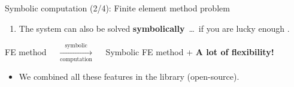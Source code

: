 \begin{frame}{Symbolic computation (2/4): Finite element method problem}
\begin{itemize}
\begin{enumerate}
      \item The system can also be solved \textbf{symbolically}~\dots~if you are lucky enough \raisebox{-3.5pt}{\huge\trollface{}}.
    \end{enumerate}
  \end{itemize}
  \begin{center}\begin{minipage}{10.75cm}\begin{block}{}
    \centering
    FE method $\quad \xrightarrow[\text{computation}]{\text{symbolic}} \quad$ Symbolic FE method + \textcolor{mycolor5}{\textbf{A lot of flexibility!}}
  \end{block}\end{minipage}\end{center}
  \begin{itemize}
    \item We combined all these features in the \Maple{} \TrussMe{} library (open-source).
  \end{itemize}
\end{frame}

